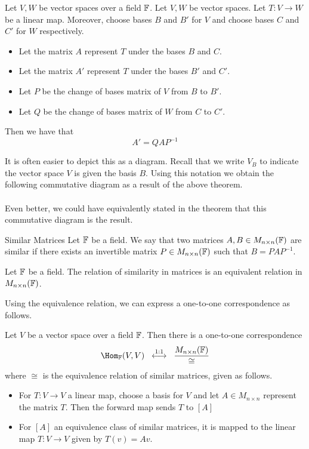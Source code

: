 \documentclass[a4paper]{article}
\begin{document}
\begin{thm}{}{} Let $V,W$ be vector spaces over a field $\mathbb{F}$. Let $V,W$ be vector spaces. Let $T:V\to W$ be a linear map. Moreover, choose bases $B$ and $B'$ for $V$ and choose bases $C$ and $C'$ for $W$ respectively. 
\begin{itemize}
\item Let the matrix $A$ represent $T$ under the bases $B$ and $C$. 
\item Let the matrix $A'$ represent $T$ under the bases $B'$ and $C'$. 
\item Let $P$ be the change of bases matrix of $V$ from $B$ to $B'$. 
\item Let $Q$ be the change of bases matrix of $W$ from $C$ to $C'$. 
\end{itemize}
Then we have that $$A'=QAP^{-1}$$
\end{thm}

It is often easier to depict this as a diagram. Recall that we write $V_B$ to indicate the vector space $V$ is given the basis $B$. Using this notation we obtain the following commutative diagram as a result of the above theorem. \\
\\
Even better, we could have equivalently stated in the theorem that this commutative diagram is the result. 

\begin{defn}{Similar Matrices}{} Let $\mathbb{F}$ be a field. We say that two matrices $A,B\in M_{n\times n}(\mathbb{F})$ are similar if there exists an invertible matrix $P\in M_{n\times n}(\mathbb{F})$ such that $B=PAP^{-1}$. 
\end{defn}

\begin{lmm}{}{} Let $\mathbb{F}$ be a field. The relation of similarity in matrices is an equivalent relation in $M_{n\times n}(\mathbb{F})$. 
\end{lmm}

Using the equivalence relation, we can express a one-to-one correspondence as follows. 

\begin{thm}{}{} Let $V$ be a vector space over a field $\mathbb{F}$. Then there is a one-to-one correspondence $$\Hom_\F(V,V)\;\;\overset{1:1}{\longleftrightarrow}\;\;\frac{M_{n\times n}(\F)}{\cong}$$ where $\cong$ is the equivalence relation of similar matrices, given as follows. 
\begin{itemize}
\item For $T:V\to V$ a linear map, choose a basis for $V$ and let $A\in M_{n\times n}$ represent the matrix $T$. Then the forward map sends $T$ to $[A]$
\item For $[A]$ an equivalence class of similar matrices, it is mapped to the linear map $T:V\to V$ given by $T(v)=Av$. 
\end{itemize}
\end{thm}
\end{document}
